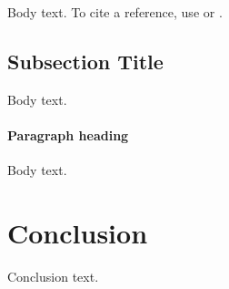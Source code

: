 \documentclass[letterpaper,11pt,leqno]{article}
\begin{document}
Body text. To cite a reference, use \citep{authorYY} or \citet{authorYY}.

\subsection{Subsection Title}

Body text.

\paragraph{Paragraph heading} Body text.

%

\section{Conclusion}\label{s:ccl}

Conclusion text.


\end{document}
